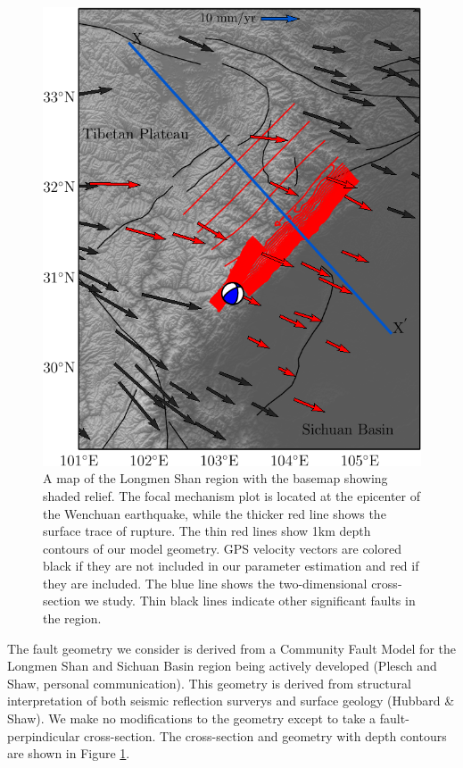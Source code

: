 \documentclass[12pt]{article}
\begin{document}
\begin{figure}[h!]
    \centering
    \includegraphics{figs/lms_map_all.pdf}
    \caption{A map of the Longmen Shan region with the basemap showing shaded relief. The focal mechanism plot is located at the epicenter of the Wenchuan earthquake, while the thicker red line shows the surface trace of rupture. The thin red lines show 1km depth contours of our model geometry. GPS velocity vectors are colored black if they are not included in our parameter estimation and red if they are included. The blue line shows the two-dimensional cross-section we study. Thin black lines indicate other significant faults in the region.}
    \label{fig:regional_map}
\end{figure}

The fault geometry we consider is derived from a Community Fault Model for the Longmen Shan and Sichuan Basin region being actively developed (Plesch and Shaw, personal communication).  This geometry is derived from structural interpretation of both seismic reflection surverys and surface geology (Hubbard \& Shaw).  We make no modifications to the geometry except to take a fault-perpindicular cross-section.  The cross-section and geometry with depth contours are shown in Figure \ref{fig:regional_map}.
\end{document}
